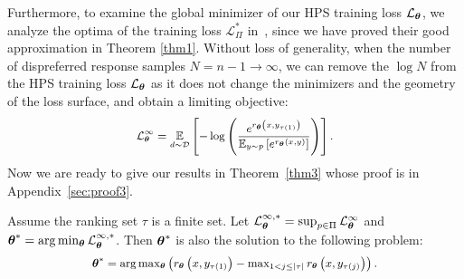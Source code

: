 Furthermore, to examine the global minimizer of our HPS training loss $\mathcal{L}_{{\boldsymbol{\theta}}}$, we analyze the optima of  the training loss $\mathcal{L}_{\Pi}^*$  in~, since we have proved their good approximation in  Theorem \ref{thm1}. Without loss of generality, when the number of dispreferred response samples $N=n-1\rightarrow\infty$,  we can remove the   $\log{N}$ from the HPS training loss $\mathcal{L}_{{\boldsymbol{\theta}}}$ as it does not change the minimizers and the geometry of the loss surface, and obtain  a limiting objective:
\begin{equation}
	\fontsize{9}{3}\selectfont{
		\begin{aligned}
			\label{eq:limit2player}
			\mathcal{L}_{\wm}^{\infty}=\expectation\limits_{d \sim \mathcal{D}}\left[-\log\left(\frac{e^{r_{\wm}\left(x,y_{\tau(1)}\right)}}{\expectation\nolimits_{y \sim p}\left[e^{r_{\wm}\left(x,y\right)}\right]}\right)\right].
	\end{aligned}}
\end{equation}
Now we are ready to give our results in Theorem~\ref{thm3} whose proof is in Appendix~\ref{sec:proof3}. 
\vspace{-1pt}
\begin{theorem}
	\label{thm3}
	Assume the ranking set $\tau$ is a finite set. Let $\mathcal{L}_{{\boldsymbol{\theta}}}^{\infty,*} = \sup_{p\in\Pi}\mathcal{L}_{{\boldsymbol{\theta}}}^{\infty}$ and $ \boldsymbol{\theta}^{*} = \arg\min_{{\boldsymbol{\theta}}} \mathcal{L}_{{\boldsymbol{\theta}}}^{\infty,*} $.  Then $ \boldsymbol{\theta}^{*}$ is also the solution to the following problem:
    \vspace{-5pt}
    \begin{equation}\label{afsafds}
		\fontsize{9}{3}\selectfont{
		\begin{aligned}
			\wms =	\arg\max\nolimits_{\wm}\left(r_{\wm}\left(x,y_{\tau(1)}\right)-\max\nolimits_{1<j\leq |\tau|}r_{\wm}\left(x,y_{\tau(j)}\right)\right).
		\end{aligned}}
\end{equation}
\end{theorem}
\vspace{-10pt}
